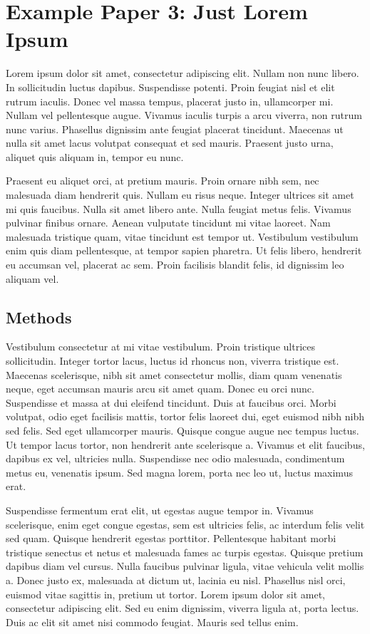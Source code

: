 \chapter{Example Paper 3: Just Lorem Ipsum}
\label{ch:hseUtilization}

\noindent 
Lorem ipsum dolor sit amet, consectetur adipiscing elit. Nullam non nunc libero. In sollicitudin luctus dapibus. Suspendisse potenti. Proin feugiat nisl et elit rutrum iaculis. Donec vel massa tempus, placerat justo in, ullamcorper mi. Nullam vel pellentesque augue. Vivamus iaculis turpis a arcu viverra, non rutrum nunc varius. Phasellus dignissim ante feugiat placerat tincidunt. Maecenas ut nulla sit amet lacus volutpat consequat et sed mauris. Praesent justo urna, aliquet quis aliquam in, tempor eu nunc.

Praesent eu aliquet orci, at pretium mauris. Proin ornare nibh sem, nec malesuada diam hendrerit quis. Nullam eu risus neque. Integer ultrices sit amet mi quis faucibus. Nulla sit amet libero ante. Nulla feugiat metus felis. Vivamus pulvinar finibus ornare. Aenean vulputate tincidunt mi vitae laoreet. Nam malesuada tristique quam, vitae tincidunt est tempor ut. Vestibulum vestibulum enim quis diam pellentesque, at tempor sapien pharetra. Ut felis libero, hendrerit eu accumsan vel, placerat ac sem. Proin facilisis blandit felis, id dignissim leo aliquam vel.

\section{Methods}

Vestibulum consectetur at mi vitae vestibulum. Proin tristique ultrices sollicitudin. Integer tortor lacus, luctus id rhoncus non, viverra tristique est. Maecenas scelerisque, nibh sit amet consectetur mollis, diam quam venenatis neque, eget accumsan mauris arcu sit amet quam. Donec eu orci nunc. Suspendisse et massa at dui eleifend tincidunt. Duis at faucibus orci. Morbi volutpat, odio eget facilisis mattis, tortor felis laoreet dui, eget euismod nibh nibh sed felis. Sed eget ullamcorper mauris. Quisque congue augue nec tempus luctus. Ut tempor lacus tortor, non hendrerit ante scelerisque a. Vivamus et elit faucibus, dapibus ex vel, ultricies nulla. Suspendisse nec odio malesuada, condimentum metus eu, venenatis ipsum. Sed magna lorem, porta nec leo ut, luctus maximus erat.

Suspendisse fermentum erat elit, ut egestas augue tempor in. Vivamus scelerisque, enim eget congue egestas, sem est ultricies felis, ac interdum felis velit sed quam. Quisque hendrerit egestas porttitor. Pellentesque habitant morbi tristique senectus et netus et malesuada fames ac turpis egestas. Quisque pretium dapibus diam vel cursus. Nulla faucibus pulvinar ligula, vitae vehicula velit mollis a. Donec justo ex, malesuada at dictum ut, lacinia eu nisl. Phasellus nisl orci, euismod vitae sagittis in, pretium ut tortor. Lorem ipsum dolor sit amet, consectetur adipiscing elit. Sed eu enim dignissim, viverra ligula at, porta lectus. Duis ac elit sit amet nisi commodo feugiat. Mauris sed tellus enim.

